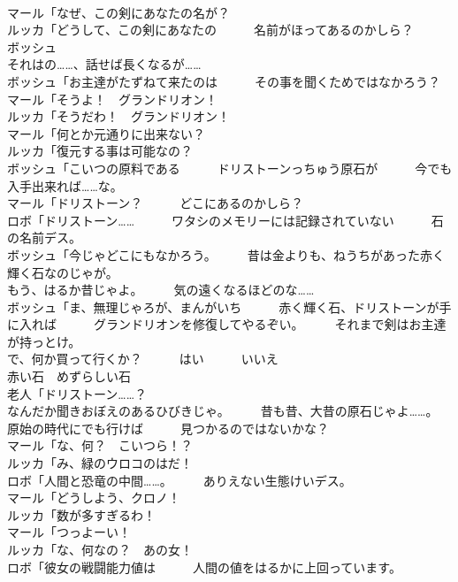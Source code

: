 \documentclass[8pt]{extreport}
\begin{document}
\begin{CJK}{UTF8}{min}
\\	マール「なぜ、この剣にあなたの名が？	
\\	ルッカ「どうして、この剣にあなたの　　　名前がほってあるのかしら？	
\\	ボッシュ
\\	それはの……、話せば長くなるが……	
\\	ボッシュ「お主達がたずねて来たのは　　　その事を聞くためではなかろう？	
\\	マール「そうよ！　グランドリオン！	
\\	ルッカ「そうだわ！　グランドリオン！	
\\	マール「何とか元通りに出来ない？	
\\	ルッカ「復元する事は可能なの？	
\\	ボッシュ「こいつの原料である　　　ドリストーンっちゅう原石が　　　今でも入手出来れば……な。	
\\	マール「ドリストーン？　　　どこにあるのかしら？	
\\	ロボ「ドリストーン……　　　ワタシのメモリーには記録されていない　　　石の名前デス。	
\\	ボッシュ「今じゃどこにもなかろう。　　　昔は金よりも、ねうちがあった赤く　　　輝く石なのじゃが。	
\\	もう、はるか昔じゃよ。　　　気の遠くなるほどのな……	
\\	ボッシュ「ま、無理じゃろが、まんがいち　　　赤く輝く石、ドリストーンが手に入れば　　　グランドリオンを修復してやるぞい。　　　それまで剣はお主達が持っとけ。	
\\	で、何か買って行くか？　　　はい　　　いいえ	
\\	赤い石　めずらしい石	
\\	老人「ドリストーン……？	
\\	なんだか聞きおぼえのあるひびきじゃ。　　　昔も昔、大昔の原石じゃよ……。	
\\	原始の時代にでも行けば　　　見つかるのではないかな？	
\\	マール「な、何？　こいつら！？	
\\	ルッカ「み、緑のウロコのはだ！	
\\	ロボ「人間と恐竜の中間……。　　　ありえない生態けいデス。	
\\	マール「どうしよう、クロノ！	
\\	ルッカ「数が多すぎるわ！	
\\	マール「つっよーい！	
\\	ルッカ「な、何なの？　あの女！	
\\	ロボ「彼女の戦闘能力値は　　　人間の値をはるかに上回っています。	

\end{CJK}
\end{document}
